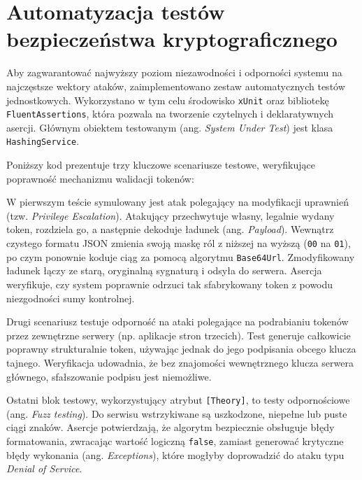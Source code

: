 \documentclass{SGGW-thesis}
\begin{document}
\section{Automatyzacja testów bezpieczeństwa kryptograficznego}

Aby zagwarantować najwyższy poziom niezawodności i odporności systemu na najczęstsze wektory ataków, zaimplementowano zestaw automatycznych testów jednostkowych. Wykorzystano w tym celu środowisko \texttt{xUnit} oraz bibliotekę \texttt{FluentAssertions}, która pozwala na tworzenie czytelnych i deklaratywnych asercji. Głównym obiektem testowanym (ang. \textit{System Under Test}) jest klasa \texttt{HashingService}.

Poniższy kod prezentuje trzy kluczowe scenariusze testowe, weryfikujące poprawność mechanizmu walidacji tokenów:

W pierwszym teście symulowany jest atak polegający na modyfikacji uprawnień (tzw. \textit{Privilege Escalation}). Atakujący przechwytuje własny, legalnie wydany token, rozdziela go, a następnie dekoduje ładunek (ang. \textit{Payload}). Wewnątrz czystego formatu JSON zmienia swoją maskę ról z niższej na wyższą (\texttt{00} na \texttt{01}), po czym ponownie koduje ciąg za pomocą algorytmu \texttt{Base64Url}. Zmodyfikowany ładunek łączy ze starą, oryginalną sygnaturą i odsyła do serwera. Asercja weryfikuje, czy system poprawnie odrzuci tak sfabrykowany token z powodu niezgodności sumy kontrolnej.

Drugi scenariusz testuje odporność na ataki polegające na podrabianiu tokenów przez zewnętrzne serwery (np. aplikacje stron trzecich). Test generuje całkowicie poprawny strukturalnie token, używając jednak do jego podpisania obcego klucza tajnego. Weryfikacja udowadnia, że bez znajomości wewnętrznego klucza serwera głównego, sfałszowanie podpisu jest niemożliwe.

Ostatni blok testowy, wykorzystujący atrybut \texttt{[Theory]}, to testy odpornościowe (ang. \textit{Fuzz testing}). Do serwisu wstrzykiwane są uszkodzone, niepełne lub puste ciągi znaków. Asercje potwierdzają, że algorytm bezpiecznie obsługuje błędy formatowania, zwracając wartość logiczną \texttt{false}, zamiast generować krytyczne błędy wykonania (ang. \textit{Exceptions}), które mogłyby doprowadzić do ataku typu \textit{Denial of Service}.

\vspace{2cm}
\end{document}
